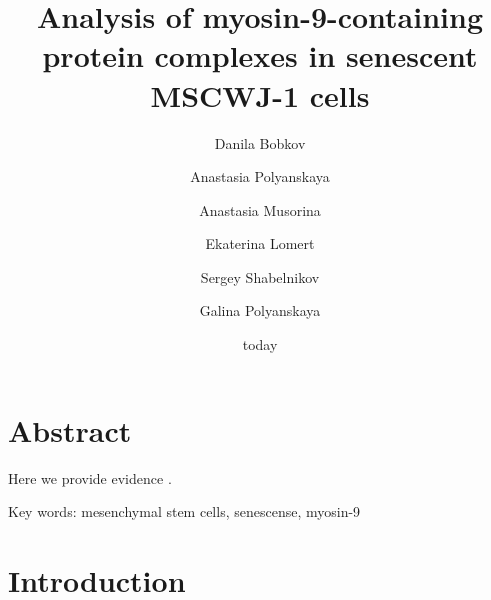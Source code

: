 \documentclass[a4paper,12pt]{article}
\title{Analysis of myosin-9-containing protein complexes in senescent MSCWJ-1 cells}
\begin{document}
\date{today}
\maketitle
\author[1,*]{Danila Bobkov}
\author[2]{Anastasia Polyanskaya}
\author[3]{Anastasia Musorina}
\author[4]{Ekaterina Lomert}
\author[5]{Sergey Shabelnikov}
\author[6]{Galina Polyanskaya}

\section{Abstract}

Here we provide evidence .

Key words: mesenchymal stem cells, senescense, myosin-9

\section{Introduction}
\end{document}

